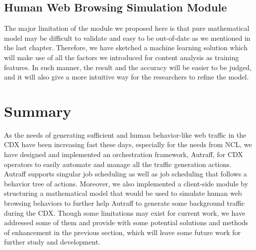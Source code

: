 \documentclass[12pt]{report}
\begin{document}
\subsection{Human Web Browsing Simulation Module}
The major limitation of the module we proposed here is that pure mathematical model may be difficult to validate and easy to be out-of-date as we mentioned in the last chapter. Therefore, we have sketched a machine learning solution which will make use of all the factors we introduced for content analysis as training features. In such manner, the result and the accuracy will be easier to be judged, and it will also give a more intuitive way for the researchers to refine the model.

\pagebreak

\section{Summary}

As the needs of generating sufficient and human behavior-like web traffic in the CDX have been increasing fast these days, especially for the needs from NCL, we have designed and implemented an orchestration framework, Autraff, for CDX operators to easily automate and manage all the traffic generation actions. Autraff supports singular job scheduling as well as job scheduling that follows a behavior tree of actions. Moreover, we also implemented a client-side module by structuring a mathematical model that would be used to simulate human web browsing behaviors to further help Autraff to generate some background traffic during the CDX. Though some limitations may exist for current work, we have addressed some of them and provide with some potential solutions and methods of enhancement in the previous section, which will leave some future work for further study and development.




\end{document}
